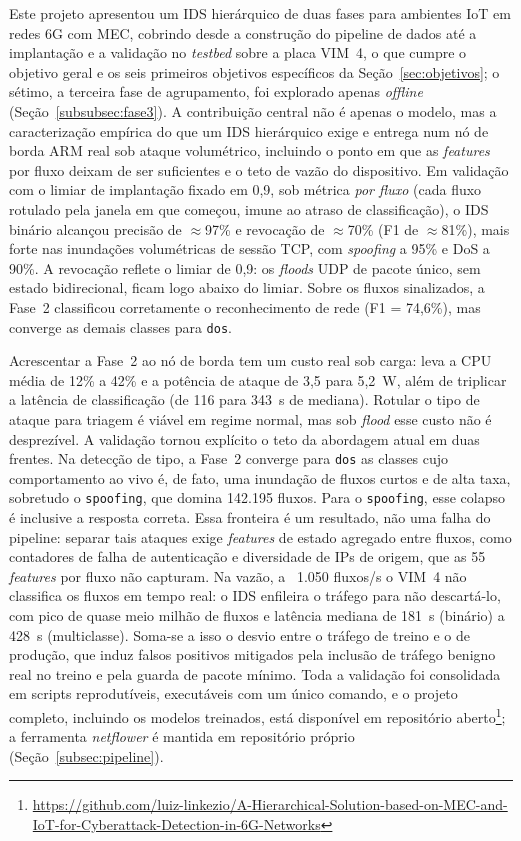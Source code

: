 \documentclass[12pt,a4paper]{article}
\begin{document}
Este projeto apresentou um IDS hierárquico de duas fases para ambientes IoT em
redes 6G com MEC, cobrindo desde a construção do pipeline de dados até a
implantação e a validação no \textit{testbed} sobre a placa VIM~4, o que cumpre
o objetivo geral e os seis primeiros objetivos específicos da
Seção~\ref{sec:objetivos}; o sétimo, a terceira fase de agrupamento, foi
explorado apenas \textit{offline} (Seção~\ref{subsubsec:fase3}). A contribuição
central não é apenas o modelo, mas a caracterização empírica do que um IDS
hierárquico exige e entrega num nó de borda ARM real sob ataque volumétrico,
incluindo o ponto em que as \textit{features} por fluxo deixam de ser suficientes
e o teto de vazão do dispositivo. Em validação com o limiar de implantação fixado
em 0,9, sob métrica \emph{por fluxo} (cada fluxo rotulado pela janela em que
começou, imune ao atraso de classificação), o IDS binário alcançou precisão de
$\approx$97\% e revocação de $\approx$70\% (F1 de $\approx$81\%), mais forte nas
inundações volumétricas de sessão TCP, com \textit{spoofing} a 95\% e DoS a 90\%.
A revocação reflete o limiar de 0,9: os \textit{floods} UDP de pacote único, sem
estado bidirecional, ficam logo abaixo do limiar. Sobre os fluxos sinalizados, a
Fase~2 classificou corretamente o reconhecimento de rede (F1 = 74,6\%), mas
converge as demais classes para \texttt{dos}.

Acrescentar a Fase~2 ao nó de borda tem um custo real sob carga: leva a CPU média
de 12\% a 42\% e a potência de ataque de 3,5 para 5,2~W, além de triplicar a
latência de classificação (de 116 para 343~s de mediana). Rotular o tipo de ataque
para triagem é viável em regime normal, mas sob \textit{flood} esse custo não é
desprezível. A validação tornou explícito o teto da abordagem atual em duas
frentes. Na detecção de tipo, a Fase~2 converge para \texttt{dos} as classes cujo
comportamento ao vivo é, de fato, uma inundação de fluxos curtos e de alta taxa,
sobretudo o \texttt{spoofing}, que domina 142.195 fluxos. Para o \texttt{spoofing},
esse colapso é inclusive a resposta correta. Essa fronteira é um resultado, não
uma falha do pipeline: separar tais ataques exige \textit{features} de estado
agregado entre fluxos, como contadores de falha de autenticação e diversidade de
IPs de origem, que as 55 \textit{features} por fluxo não capturam. Na vazão, a
~1.050 fluxos/s o VIM~4 não classifica os fluxos em tempo real: o IDS enfileira o
tráfego para não descartá-lo, com pico de quase meio milhão de fluxos e latência
mediana de 181~s (binário) a 428~s (multiclasse). Soma-se a isso o desvio entre o
tráfego de treino e o de produção, que induz falsos positivos mitigados pela
inclusão de tráfego benigno real no treino e pela guarda de pacote mínimo. Toda a
validação foi
consolidada em scripts reprodutíveis, executáveis com um único comando, e o
projeto completo, incluindo os modelos treinados, está disponível em repositório
aberto\footnote{\url{https://github.com/luiz-linkezio/A-Hierarchical-Solution-based-on-MEC-and-IoT-for-Cyberattack-Detection-in-6G-Networks}};
a ferramenta \textit{netflower} é mantida em repositório próprio
(Seção~\ref{subsec:pipeline}).
\end{document}
